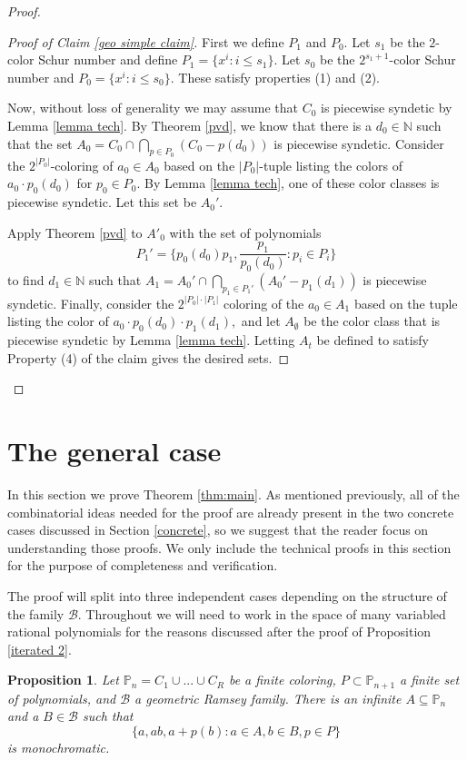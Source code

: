 \documentclass[10pt,a4paper]{article}
\newtheorem{proposition}[theorem]{Proposition}
\theoremstyle{definition}
\begin{document}
\begin{proof}
\begin{proof}[Proof of Claim \ref{geo simple claim}]
First we define $P_1$ and $P_0.$ Let $s_1$ be the $2$-color Schur number and define $P_1=\{x^i: i\leq s_1\}.$  Let $s_0$ be the $2^{s_1+1}$-color Schur number and $P_0=\{x^i: i\leq s_0\}.$  These satisfy properties (1) and (2).

Now, without loss of generality we may assume that $C_0$ is piecewise syndetic by Lemma \ref{lemma tech}.  By Theorem \ref{pvd}, we know that there is a $d_0\in \mathbb{N}$ such that the set $A_0=C_0\cap\bigcap_{p\in P_0} (C_0-p(d_0))$ is piecewise syndetic.  Consider the $2^{|P_0|}$-coloring of $a_0\in A_0$ based on the $|P_0|$-tuple listing the colors of $a_0\cdot p_0(d_0)$ for $p_0\in P_0.$  By Lemma \ref{lemma tech}, one of these color classes is piecewise syndetic.  Let this set be $A_0'.$

Apply Theorem \ref{pvd} to $A'_0$ with the set of polynomials $$P_1'=\{p_0(d_0) p_1,\frac{p_1}{p_0(d_0)}: p_i\in P_i\} $$ to find $d_1\in \mathbb{N}$ such that $A_1=A_0'\cap\bigcap_{p_1\in P_1'} (A_0'-p_1(d_1))$ is piecewise syndetic.  Finally, consider the $2^{|P_0|\cdot|P_1|}$ coloring of the $a_0\in A_1$ based on the tuple listing the color of $a_0\cdot p_0(d_0)\cdot p_1(d_1),$ and let $A_\emptyset$ be the color class that is piecewise syndetic by Lemma \ref{lemma tech}.  Letting $A_t$ be defined to satisfy Property (4) of the claim gives the desired sets.
\end{proof}



\end{proof}

\section{The general case}

In this section we prove Theorem \ref{thm:main}.  As mentioned previously, all of the combinatorial ideas needed for the proof are already present in the two concrete cases discussed in Section \ref{concrete}, so we suggest that the reader focus on understanding those proofs.  We only include the technical proofs in this section for the purpose of completeness and verification.

The proof will split into three independent cases depending on the structure of the family $\mathcal{B}$.  Throughout we will need to work in the space of many variabled rational polynomials for the reasons discussed after the proof of Proposition \ref{iterated 2}.  

\begin{proposition}\label{geo proof}
Let $\mathbb{P}_n=C_1\cup...\cup C_R$ be a finite coloring, $P\subset \mathbb{P}_{n+1}$ a finite set of polynomials, and $\mathcal{B}$ a geometric Ramsey family.  There is an infinite $A\subseteq \mathbb{P}_n$ and a $B\in\mathcal{B}$ such that $$\{a,ab,a+p(b): a\in A, b\in B, p\in P\}$$ is monochromatic.  
\end{proposition}
\end{document}
